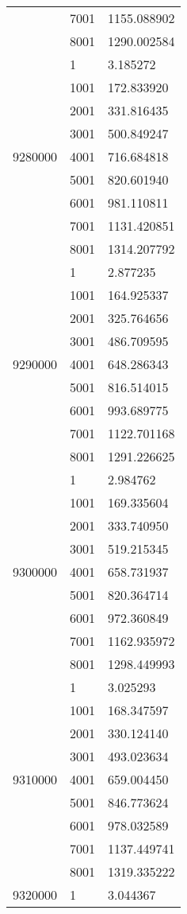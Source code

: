 \begin{table}[htb!]
\begin{tabular}{lll}
 & 7001 & 1155.088902 \\
 & 8001 & 1290.002584 \\
\multirow[c]{9}{*}{9280000} & 1 & 3.185272 \\
 & 1001 & 172.833920 \\
 & 2001 & 331.816435 \\
 & 3001 & 500.849247 \\
 & 4001 & 716.684818 \\
 & 5001 & 820.601940 \\
 & 6001 & 981.110811 \\
 & 7001 & 1131.420851 \\
 & 8001 & 1314.207792 \\
\multirow[c]{9}{*}{9290000} & 1 & 2.877235 \\
 & 1001 & 164.925337 \\
 & 2001 & 325.764656 \\
 & 3001 & 486.709595 \\
 & 4001 & 648.286343 \\
 & 5001 & 816.514015 \\
 & 6001 & 993.689775 \\
 & 7001 & 1122.701168 \\
 & 8001 & 1291.226625 \\
\multirow[c]{9}{*}{9300000} & 1 & 2.984762 \\
 & 1001 & 169.335604 \\
 & 2001 & 333.740950 \\
 & 3001 & 519.215345 \\
 & 4001 & 658.731937 \\
 & 5001 & 820.364714 \\
 & 6001 & 972.360849 \\
 & 7001 & 1162.935972 \\
 & 8001 & 1298.449993 \\
\multirow[c]{9}{*}{9310000} & 1 & 3.025293 \\
 & 1001 & 168.347597 \\
 & 2001 & 330.124140 \\
 & 3001 & 493.023634 \\
 & 4001 & 659.004450 \\
 & 5001 & 846.773624 \\
 & 6001 & 978.032589 \\
 & 7001 & 1137.449741 \\
 & 8001 & 1319.335222 \\
\multirow[c]{9}{*}{9320000} & 1 & 3.044367 \\

\end{tabular}
\end{table}
